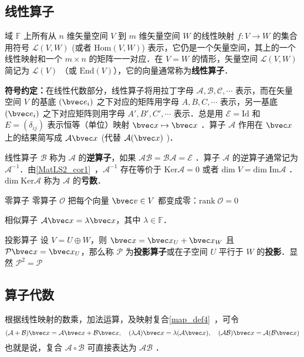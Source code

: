 
\begin{issues}
\issueTODO
\end{issues}

\subsection{线性算子}
域 $\mathbb{F}$ 上所有从 $n$ 维矢量空间 $V$ 到 $m$ 维矢量空间 $W$ 的线性映射 $f:V\rightarrow W$ 的集合用符号 $\mathcal{L}(V,W)$ (或者 $\mathrm{Hom}(V,W)$) 表示，它仍是一个矢量空间，其上的一个线性映射和一个 $m\times n$ 的矩阵一一对应．在 $V=W$ 的情形，矢量空间 $\mathcal{L}(V,W)$ 简记为 $\mathcal{L}(V)$ （或 $\mathrm{End}(V)$），它的向量通常称为\textbf{线性算子}．

\textbf{符号约定：}在线性代数部分，线性算子将用拉丁字母 $\mathcal{A,B,C,\cdots}$ 表示，而在矢量空间 $V$ 的基底 $(\bvec e_i)$ 之下对应的矩阵用字母 $A,B,C,\cdots$ 表示，另一基底 $(\bvec e_i)$ 之下对应矩阵则用字母 $A',B',C',\cdots$ 表示．总是用 $\mathcal{E}=\mathrm{Id}$ 和 $E=(\delta_{ij})$ 表示恒等（单位）映射 $\bvec x\mapsto \bvec x$ ．算子 $\mathcal{A}$ 作用在 $\bvec x$ 上的结果简写成 $\mathcal{A}\bvec x$ (代替 $\mathcal{A}(\bvec x)$ )．

线性算子 $\mathcal{B}$ 称为 $\mathcal{A}$ 的\textbf{逆算子}，如果 $\mathcal{AB}=\mathcal{BA}=\mathcal{E}$ ．算子 $\mathcal{A}$ 的逆算子通常记为 $\mathcal{A}^{-1}$．由\autoref{MatLS2_cor1}~，$\mathcal{A}^{-1}$ 存在等价于 $\mathrm{Ker}\mathcal{A}=0$ 或者 $\mathrm{dim}\;V=\mathrm{dim\;Im}\mathcal{A}$ ．$\mathrm{dim\;Ker}\mathcal{A}$ 称为 $\mathcal{A}$ 的\textbf{亏数}．
\begin{example}{零算子}
零算子 $\mathcal{O}$ 把每个向量 $\bvec v\in V$ 都变成零：$\mathrm{rank}\; \mathcal{O}=0$
\end{example}
\begin{example}{相似算子}
$\mathcal{A}\bvec x=\lambda\bvec x$，其中 $\lambda\in\mathbb{F}$．
\end{example}
\begin{example}{投影算子}
设 $V=U\oplus W$，则 $\bvec x=\bvec x_U+\bvec x_W$ 且 $\mathcal{P}\bvec x=\bvec x_U$，那么称 $\mathcal{P}$ 为\textbf{投影算子}或在子空间 $U$ 平行于 $W$ 的\textbf{投影}．显然 $\mathcal{P}^2=\mathcal{P}$
\end{example}
\subsection{算子代数}
根据线性映射的数乘，加法运算，及映射复合\autoref{map_def4}~，可令
\begin{equation}\label{LiOper_eq1}
(\mathcal{A}+\mathcal{B})\bvec x=\mathcal{A}\bvec x+\mathcal{B}\bvec x,\quad (\lambda\mathcal A)\bvec x=\lambda(\mathcal A\bvec x),\quad (\mathcal{AB})\bvec x=\mathcal{A}(\mathcal{B}\bvec x)
\end{equation}
也就是说，复合 $\mathcal{A\circ B}$ 可直接表达为 $\mathcal{AB}$ ．

